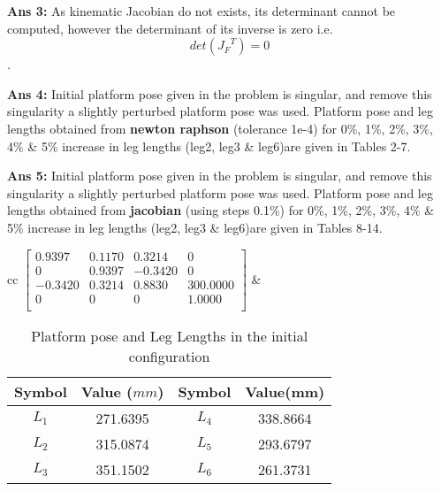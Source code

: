 \documentclass[10pt]{article}
\begin{document}
\vspace{4mm}
\textbf{Ans 3:} As kinematic Jacobian do not exists, its determinant cannot be computed, however the determinant of its inverse is zero i.e. $$ det({J_F}^T) = 0 $$.


\textbf{Ans 4:} Initial platform pose given in the problem is singular, and remove this singularity a slightly perturbed platform pose was used. Platform pose and leg lengths obtained from \textbf{newton raphson} (tolerance 1e-4) for 0\%, 1\%, 2\%, 3\%, 4\% \& 5\% increase in leg lengths (leg2, leg3 \& leg6)are given in Tables 2-7.

\vspace{4mm}
\textbf{Ans 5:} Initial platform pose given in the problem is singular, and remove this singularity a slightly perturbed platform pose was used. Platform pose and leg lengths obtained from \textbf{jacobian} (using steps 0.1\%) for 0\%, 1\%, 2\%, 3\%, 4\% \& 5\% increase in leg lengths (leg2, leg3 \& leg6)are given in Tables 8-14.

\pagebreak
\begin{table*}[h!]
	\centering
	\begin{tabular}{cc}
	$\begin{bmatrix}
	0.9397  & 0.1170 & 0.3214  & 0        \\ 
	0       & 0.9397 & -0.3420 & 0        \\ 
	-0.3420 & 0.3214 & 0.8830  & 300.0000 \\ 
	0       & 0      & 0       & 1.0000   \\ 
	\end{bmatrix}$
	 & 
	 	\begin{tabular}{cccc}
	 	\hline
	 	Symbol & Value ($mm$) & Symbol & Value(mm) \\
	 	\hline
	 	$L_1$ & 271.6395 & $L_4$ & 338.8664\\
	 	$L_2$ & 315.0874 & $L_5$ & 293.6797\\
	 	$L_3$ & 351.1502 & $L_6$ & 261.3731\\	 	\hline
	 \end{tabular}
	\end{tabular}
	\caption{Platform pose and Leg Lengths in the initial configuration}
\end{table*}
\end{document}
